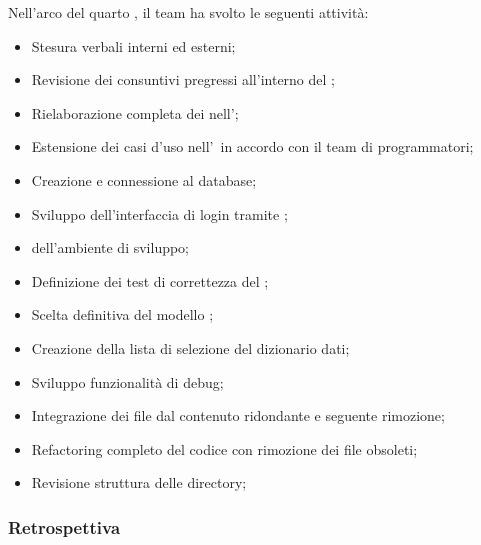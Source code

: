 Nell'arco del quarto , il team ha svolto le seguenti attività:
\begin{itemize}
    \item Stesura verbali interni ed esterni;
    \item Revisione dei consuntivi pregressi all'interno del \PdP;
    \item Rielaborazione completa dei  nell'\AdR;
    \item Estensione dei casi d'uso nell'\AdR\ in accordo con il team di programmatori;
    \item Creazione e connessione al database;
    \item Sviluppo dell'interfaccia di login tramite ;
    \item {} dell'ambiente di sviluppo;
    \item Definizione dei test di correttezza del ;
    \item Scelta definitiva del modello ;
    \item Creazione della lista di selezione del dizionario dati;
    \item Sviluppo funzionalità di debug;
    \item Integrazione dei file dal contenuto ridondante e seguente rimozione;
    \item Refactoring completo del codice con rimozione dei file obsoleti;
    \item Revisione struttura delle directory;
\end{itemize}

\subsubsection{Retrospettiva}


